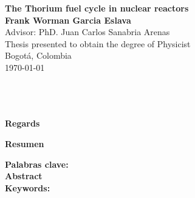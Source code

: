 \begin{center}
\begin{figure*}
\centering%
%
\end{figure*}
\thispagestyle{empty} \vspace*{2.0cm} \textbf{\LARGE
The Thorium fuel cycle in nuclear reactors}\\[2.5cm]

\Large\textbf{Frank Worman Garcia Eslava}\\[2.0cm]

Advisor: PhD. Juan Carlos Sanabria Arenas \\[2.0cm]


\Large Thesis presented to obtain the degree of Physicist \\ [2.0cm]


Bogot\'{a}, Colombia\\ [0.5cm]
\today \\
\end{center}

\newpage{\pagestyle{empty}\cleardoublepage}

\newpage
\thispagestyle{empty} \textbf{}\normalsize
\\\\\\%
\textbf{\LARGE Regards}\\



\newpage{\pagestyle{empty}\cleardoublepage}

\textbf{\LARGE Resumen}


\textbf{\small Palabras clave: }\\


\newpage
\textbf{\LARGE Abstract}\\


\textbf{\small Keywords:}\\